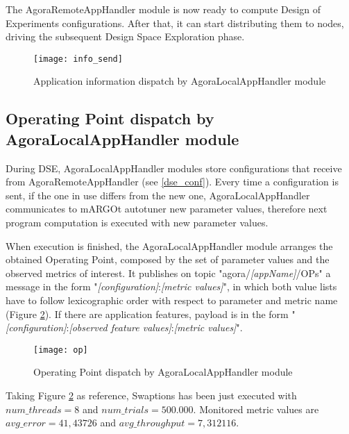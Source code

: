 The AgoraRemoteAppHandler module is now ready to compute Design of Experiments configurations. After that, it can start distributing them to nodes, driving the subsequent Design Space Exploration phase.

\begin{figure}[t]

    \centering
    \texttt{[image: info\_send]}
    \caption{Application information dispatch by AgoraLocalAppHandler module}
    \label{fig:info_send}
    
\end{figure}





\subsection{Operating Point dispatch by AgoraLocalAppHandler module}\label{opSend}

During DSE, AgoraLocalAppHandler modules store configurations that receive from AgoraRemoteAppHandler (see \ref{dse_conf}). Every time a configuration is sent, if the one in use differs from the new one, AgoraLocalAppHandler communicates to mARGOt autotuner new parameter values, therefore next program computation is executed with new parameter values.

When execution is finished, the AgoraLocalAppHandler module arranges the obtained Operating Point, composed by the set of parameter values and the observed metrics of interest. It publishes on topic "agora/\textit{[appName]}/OPs" a message in the form "\textit{[configuration]}:\textit{[metric values]}", in which both value lists have to follow lexicographic order with respect to parameter and metric name (Figure \ref{fig:op}). If there are application features, payload is in the form "\textit{[configuration]}:\textit{[ob\-served feature values]}:\textit{[metric values]}".

\begin{figure}[htb]

    \centering
    \texttt{[image: op]}
    \caption{Operating Point dispatch by AgoraLocalAppHandler module}
    \label{fig:op}
    
\end{figure}

Taking Figure \ref{fig:op} as reference, Swaptions has been just executed with\linebreak $num\_threads = 8$ and $num\_trials = 500.000$. Monitored metric values are $avg\_error = 41,43726$ and $avg\_throughput = 7,312116$.

